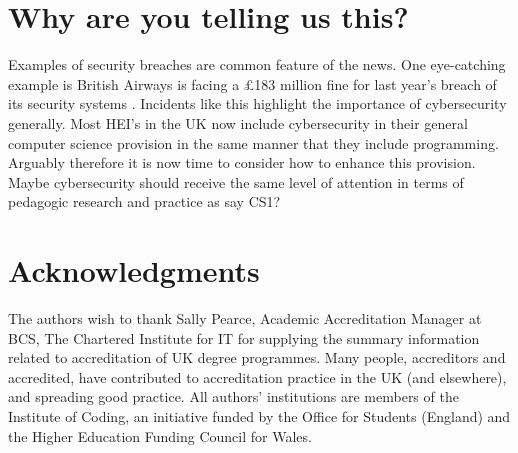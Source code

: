 \documentclass[sigconf]{acmart}
\begin{document}
\begin{comment}
It is the view of the authors that the computer science education community collectively should address these (and other emergent) issues related to the delivery of good quality embedded cybersecurity education.
\end{comment}

\section{Why are you telling us this?}	
Examples of security breaches are common feature of the news. One eye-catching example is British Airways is facing a \pounds183 million fine for last year's breach of its security systems \cite{BBC2019}. Incidents like this highlight the importance of cybersecurity generally. Most HEI's in the UK now include cybersecurity in their general computer science provision in the same manner that they include programming. Arguably therefore it is now time to consider how to enhance this provision. Maybe cybersecurity should receive the same level of attention in terms of pedagogic research and practice as say CS1?  
\section{Acknowledgments}
The authors wish to thank Sally Pearce, Academic Accreditation Manager at BCS, The Chartered Institute for IT for supplying the summary information related to accreditation of UK degree programmes. Many people, accreditors and accredited, have contributed to accreditation practice in the UK (and elsewhere), and spreading good practice.  All authors' institutions are members of the Institute of Coding, an initiative funded by the Office for Students (England) and the Higher Education Funding Council for Wales.

%

\end{document}
